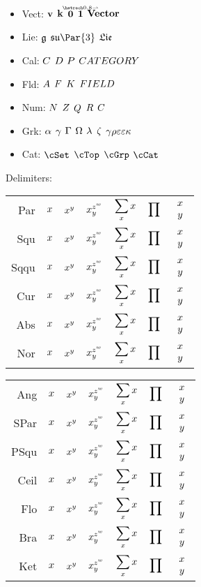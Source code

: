 \documentclass[11pt]{article}
\begin{document}
\mkPsetTitle{}

\newcommand{\alphabet}{Aa\,Bb\,Cc\,Dd\,Ee\,Ff\,Gg\,Hh\,Ii\,Jj\,Kk\,Ll\,Mm\,Nn\,Oo\,Pp\,Qq\,Rr\,Ss\,Tt\,Uu\,Vv\,Ww\,Xx\,Yy\,Zz}
\newcommand{\numbers}{1\,2\,3\,4\,5\,6\,7\,8\,9\,0}

\begin{itemize}
    \item Vect: $\mathbf{v}$ $\mathbf{k}$ $\mathbf{0}$ $\veca1$ $\mathbf{V}\mathbf{e}\mathbf{c}\mathbf{t}\mathbf{o}\mathbf{r}$
    \item Lie: $\mathfrak{g}$ $\Ls\Lu\Par{3}$ $\mathfrak{L}\mathfrak{i}\mathfrak{e}$
    \item Cal: $\CC$ $\CD$ $\CP$ $\CC\CA\CT\CE\CG\CO\CR\CY$
    \item Fld: $\fA$ $\fF$ $\fK$ $\fF\fI\fE\fL\fD$
    \item Num: $\N$ $\Z$ $\Q$ $\R$ $\C$
    \item Grk: $\alpha$ $\gamma$ $\Gamma$ $\Omega$ $\lambda$ $\zeta$ $\gamma\rho\varepsilon\varepsilon\kappa$
    \item Cat: $\cSet$ $\cTop$ $\cGrp$ $\cCat$
\end{itemize}

\newcommand{\deltest}[1]{%
#1 
& $\call{#1}{x}$ 
& $\call{#1}{x^y}$
& $x_{\call{#1}{y}}^{z^{\call{#1}{w}}}$
& $\displaystyle{\call{#1}{\sum_{\call{#1}{x}} \Cx}}$ 
& $\displaystyle{\call{#1}{\prod}}$
& $\call{#1}{\begin{array}{c}x\\y\end{array}}$ \\[6ex]
}

Delimiters:
\begin{center}
\begin{tabular}{r|cccccc}
    \deltest{Par} 
    \deltest{Squ}
    \deltest{Sqqu}
    \deltest{Cur}
    \deltest{Abs}
    \deltest{Nor}
\end{tabular}
\begin{tabular}{r|cccccc}
    \deltest{Ang}
    \deltest{SPar}
    \deltest{PSqu}
    \deltest{Ceil}
    \deltest{Flo}
    \deltest{Bra}
    \deltest{Ket}
\end{tabular}
\end{center}
\end{document}
